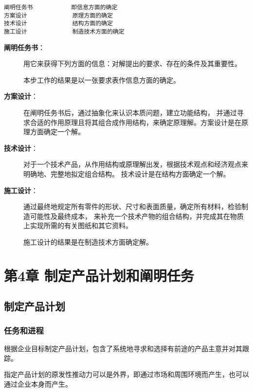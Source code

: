 \documentclass[letterpaper,10pt,english]{sphinxmanual}
\begin{document}
\begin{Verbatim}[commandchars=\\\{\}]
阐明任务书           即信息方面的确定
方案设计             原理方面的确定
技术设计             结构方面的确定
施工设计             制造技术方面的确定
\end{Verbatim}
\begin{description}
\item[{\textbf{阐明任务书}：}] \leavevmode
用它来获得下列方面的信息：对解提出的要求、存在的条件及其重要性。

本步工作的结果是以一张要求表作信息方面的确定。

\item[{\textbf{方案设计}：}] \leavevmode
在阐明任务书后，通过抽象化来认识本质问题，建立功能结构，
并通过寻求合适的作用原理且将其组合成作用结构，来确定原理解。方案设计是在原理方面确定一个解。

\item[{\textbf{技术设计}：}] \leavevmode
对于一个技术产品，从作用结构或原理解出发，根据技术观点和经济观点来明确地、完整地拟定组合结构。
技术设计是在结构方面确定一个解。

\item[{\textbf{施工设计}：}] \leavevmode
通过最终地规定所有零件的形状、尺寸和表面质量，确定所有材料，检验制造可能性及最终成本，
来补充一个技术产物的组合结构，并完成其在物质上实现所需的有关图纸和其它资料。

施工设计的结果是在制造技术方面确定解。

\end{description}


\chapter{第4章 制定产品计划和阐明任务}
\label{unit4::doc}\label{unit4:id1}

\section{制定产品计划}
\label{unit4:id2}

\subsection{任务和进程}
\label{unit4:id3}
根据企业目标制定产品计划，包含了系统地寻求和选择有前途的产品主意并对其跟踪。

指定产品计划的原发性推动力可以是外界，即通过市场和周围环境而产生，也可以通过企业本身而产生。
\end{document}

